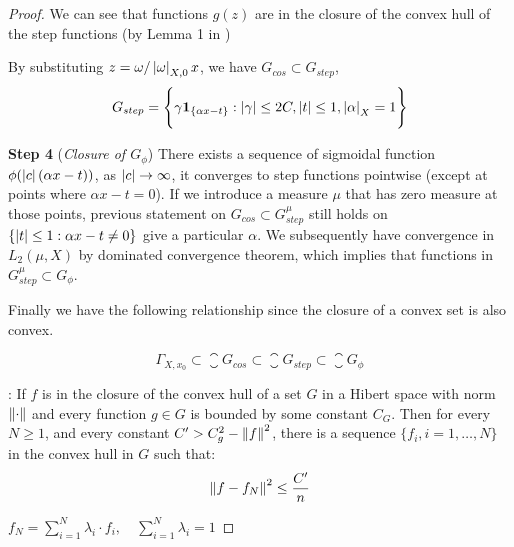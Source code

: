 \begin{proof}
    We can see that functions $g(z)$ are in the closure of the convex hull of
    the step functions (by Lemma 1 in
    \cite{barronUniversalApproximationBounds1993})

    By substituting $z = \omega/\left| \omega \right|_{X, 0} x$, we have $G_{cos} \subset
        G_{step}$,
    \begin{equation}
        G_{step} = \Bigg\{ \gamma\mathbf{1}_{\{\alpha x-t\}}: \left| \gamma \right| \leq 2C, \left| t \right| \leq 1, \left| \alpha \right|_{X} = 1\Bigg\}
    \end{equation}

    \textbf{Step 4} (\textit{Closure of $G_{\phi}$}) There exists a sequence of
    sigmoidal function $\phi(\left| c \right|(\alpha x - t))$, as $\left| c \right| \to \infty$,
    it converges to step functions pointwise (except at points where $\alpha x -
        t = 0$). If we introduce a measure $\mu$ that has zero measure at those
    points, previous statement on $G_{cos} \subset G^{\mu}_{step}$ still holds
    on $\{\left| t \right| \leq 1: \alpha x - t \not=0\}$ give a particular $\alpha$. We
    subsequently have convergence in $L_2(\mu, X)$ by dominated convergence
    theorem, which implies that functions in $G^{\mu}_{step} \subset G_{\phi}$.

    Finally we have the following relationship since the closure of a convex set
    is also convex.

    \begin{equation*}
        \Gamma_{X, x_0} \subset \closure{G_{cos}} \subset \closure{G_{step}} \subset \closure{G_{\phi}}
    \end{equation*}

    \cite[\textit{Lemma~1}]{barronUniversalApproximationBounds1993}: If $f$ is
    in the closure of the convex hull of a set $G$ in a Hibert space with norm
    $\left\| \cdot \right\|$ and every function $g \in G$ is bounded by some constant
    $C_G$. Then for every $N \geq 1$, and every constant $C' > C_g^2 -
        \left\| f \right\|^2$, there is a sequence $\{f_i, i = 1, \dots, N\}$ in the convex
    hull in $G$ such that:
    \begin{equation}
        \left\| f - f_N \right\|^2 \leq \frac{C'}{n}
    \end{equation}

    $f_N = \sum_{i=1}^N \lambda_i \cdot f_i, \quad \sum_{i=1}^N \lambda_i = 1$



\end{proof}
